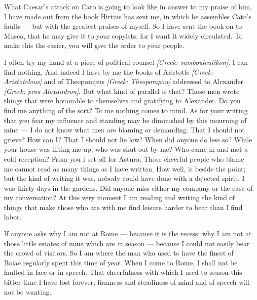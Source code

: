 

 What Caesar's attack on Cato is going to look like in answer to my praise of him, I have made out from the book Hirtius has sent me, in which he assembles Cato's faults --- but with the greatest praises of myself. So I have sent the book on to Musca, that he may give it to your copyists; for I want it widely circulated. To make this the easier, you will give the order to your people.

 I often try my hand at a piece of political counsel \textit{[Greek: sumbouleutikon]}. I can find nothing. And indeed I have by me the books of Aristotle \textit{[Greek: Aristotelous]} and of Theopompus \textit{[Greek: Theopompou]} addressed to Alexander \textit{[Greek: pros Alexandron]}. But what kind of parallel is that? Those men wrote things that were honorable to themselves and gratifying to Alexander. Do you find me anything of the sort? To me nothing comes to mind. As for your writing that you fear my influence and standing may be diminished by this mourning of mine --- I do not know what men are blaming or demanding. That I should not grieve? How can I? That I should not lie low? When did anyone do less so? While your house was lifting me up, who was shut out by me? Who came in and met a cold reception? From you I set off for Astura. Those cheerful people who blame me cannot read as many things as I have written. How well, is beside the point; but the kind of writing it was, nobody could have done with a dejected spirit. I was thirty days in the gardens. Did anyone miss either my company or the ease of my conversation? At this very moment I am reading and writing the kind of things that make those who are with me find leisure harder to bear than I find labor.

 If anyone asks why I am not at Rome --- because it is the recess; why I am not at those little estates of mine which are in season --- because I could not easily bear the crowd of visitors. So I am where the man who used to have the finest of Baiae regularly spent this time of year. When I come to Rome, I shall not be faulted in face or in speech. That cheerfulness with which I used to season this bitter time I have lost forever; firmness and steadiness of mind and of speech will not be wanting.

